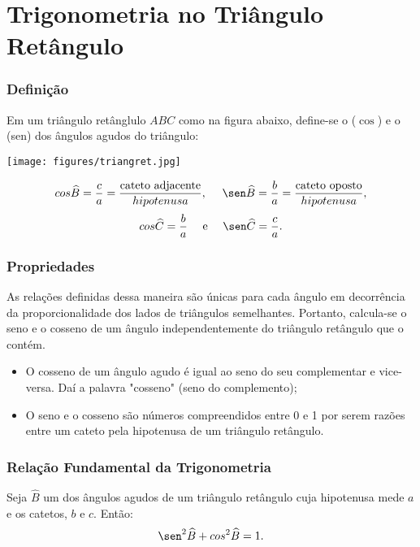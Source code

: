 \documentclass[brazil, notheorems, 10pt]{beamer}
\begin{document}
\section{Trigonometria no Triângulo Retângulo}
\begin{frame} \frametitle{Definição}
\begin{definicao}
Em um triângulo retânglulo $ABC$ como na figura abaixo, define-se o
 ($\cos$) e o  (sen) dos ângulos agudos do
triângulo:
\begin{center}
\texttt{[image: figures/triangret.jpg]}
\end{center}
$$\cos \widehat B = \frac c a = \frac {\text{cateto
adjacente}}{hipotenusa}, \ \ \ \ \sen \widehat B = \frac b a = \frac
{\text{cateto oposto}}{hipotenusa},$$
$$\cos \widehat C = \frac b a \ \ \ \ \text{e} \ \ \ \ \sen \widehat
C = \frac c a.$$
\end{definicao}



\end{frame}


\begin{frame}
\frametitle{Propriedades} %
As relações definidas dessa maneira são únicas para cada ângulo em
decorrência da proporcionalidade dos lados de triângulos
semelhantes. Portanto, calcula-se o seno e o cosseno de um ângulo
independentemente do triângulo retângulo que o contém.

\begin{proposicao}
\begin{itemize}
	\item O cosseno de um ângulo agudo é igual ao seno do seu
	complementar e vice-versa. Daí a palavra "cosseno" (seno do
	complemento);
	\item O seno e o cosseno são números compreendidos entre 0 e 1 por
	serem razões entre um cateto pela hipotenusa de um triângulo
	retângulo.
\end{itemize}
\end{proposicao}




\end{frame}


\begin{frame}
\frametitle{Relação Fundamental da Trigonometria} %

\begin{proposicao}
Seja $\widehat B$ um dos ângulos agudos de um triângulo retângulo
cuja hipotenusa mede $a$ e os catetos, $b$ e $c$. Então:
$$\sen^2 \widehat B + \cos^2 \widehat B = 1.$$
\end{proposicao}
\end{frame}
\end{document}

